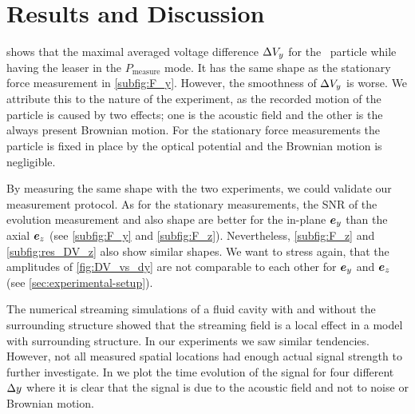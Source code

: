 \section{Results and Discussion\label{sec:results}}

 shows that the maximal averaged voltage difference 
$\Delta V_{y}$ for the \Dtwo~particle while having the leaser in the 
$P_{\text{measure}}$ mode. It has the same shape as the stationary force 
measurement in \cref{subfig:F_y}.  However, the smoothness of $\Delta V_{y}$ is 
worse. We attribute this to the nature of the experiment, as the recorded 
motion of the particle is caused by two effects; one is the acoustic field and 
the other is the always present Brownian motion.  For the stationary force 
measurements the particle is fixed in place by the optical potential and the 
Brownian motion is negligible.

By measuring the same shape with the two experiments, we could validate our 
measurement protocol. As for the stationary measurements, the SNR of the 
evolution measurement and also shape are better for the in-plane $\bm{e}_{y}$ than the 
axial $\bm{e}_{z}$ (see \cref{subfig:F_y} and \cref{subfig:F_z}). Nevertheless, 
\cref{subfig:F_z} and \cref{subfig:res_DV_z} also show similar shapes. We want 
to stress again, that the amplitudes of \cref{fig:DV_vs_dy} are not comparable 
to each other for $\bm{e}_{y}$ and $\bm{e}_{z}$ (see \cref{sec:experimental-setup}).

The numerical streaming simulations of a fluid cavity with and without the
surrounding structure showed that the streaming field is a local effect in a
model with surrounding structure. In our experiments we saw similar tendencies.  
However, not all measured spatial locations had enough actual signal strength 
to further investigate. In  we plot the time evolution 
of the signal for four different $\Delta y$ where it is clear that the signal is due 
to the acoustic field and not to noise or Brownian motion.

